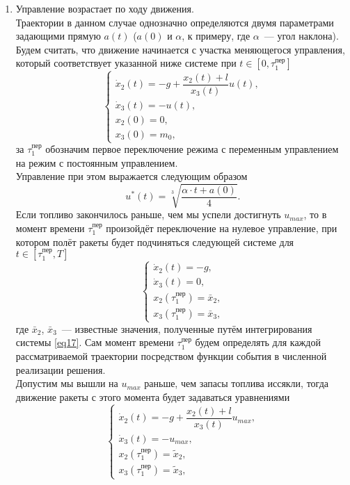 \documentclass[a4paper,12pt]{article}
\begin{document}
\begin{itemize}
\begin{enumerate}
\item Управление возрастает по ходу движения. \\
Траектории в данном случае однозначно определяются двумя параметрами задающими прямую $a(t)$ ($a(0)$ и $\alpha$, к примеру, где $\alpha$~--- угол наклона). \\
Будем считать, что движение начинается с участка меняющегося управления, который соответствует указанной ниже системе при $t \in [0, \tau_1^{\text{пер}}]$ 
\hypertarget{p17}{}
\begin{equation} \label{eq17}
	\begin{cases} 
		\dot{x}_2(t) = -g + \dfrac{x_2(t) + l}{x_3(t)}u(t), \\
		\dot{x}_3(t) = -u(t), \\
		x_2(0) = 0, \\
		x_3(0) = m_0,
	\end{cases}
\end{equation}
за $\tau_1^{\text{пер}}$ обозначим первое переключение режима с переменным управлением на режим с постоянным управлением. \\
Управление при этом выражается следующим образом
\hypertarget{p18}{}
\begin{equation} \label{eq18}
 u^*(t) = \sqrt[3]{\dfrac{\alpha \cdot t + a(0) }{4}}. 
\end{equation}
Если топливо закончилось раньше, чем мы успели достигнуть $u_{max}$, то в момент времени $\tau_1^{\text{пер}}$ произойдёт переключение на нулевое управление, при котором полёт ракеты будет подчиняться следующей системе для $t \in [\tau_1^{\text{пер}}, T]$
\hypertarget{p19}{}
\begin{equation} 
	\begin{cases} \label{eq19}
		\dot{x}_2(t) = -g, \\
		\dot{x}_3(t) = 0, \\
		x_2(\tau_1^{\text{пер}}) = \bar{x}_2, \\
		x_3(\tau_1^{\text{пер}}) = \bar{x}_3,
	\end{cases}
\end{equation} 
где $\bar{x}_2$, $\bar{x}_3$~--- известные значения, полученные путём интегрирования системы \eqref{eq17}. Сам момент времени $\tau_1^{\text{пер}}$ будем определять для каждой рассматриваемой траектории посредством функции события в численной реализации решения. \\
Допустим мы вышли на $u_{max}$ раньше, чем запасы топлива иссякли, тогда движение ракеты с этого момента будет задаваться уравнениями
\hypertarget{p20}{}
\begin{equation} \label{eq20}
	\begin{cases} 
		\dot{x}_2(t) = -g + \dfrac{x_2(t) + l}{x_3(t)}u_{max}, \\
		\dot{x}_3(t) = -u_{max}, \\
		x_2(\tau_1^{\text{пер}}) = \tilde{x}_2, \\
		x_3(\tau_1^{\text{пер}}) = \tilde{x}_3,
	\end{cases}
\end{equation}


\end{enumerate}
\end{itemize}
\end{document}
